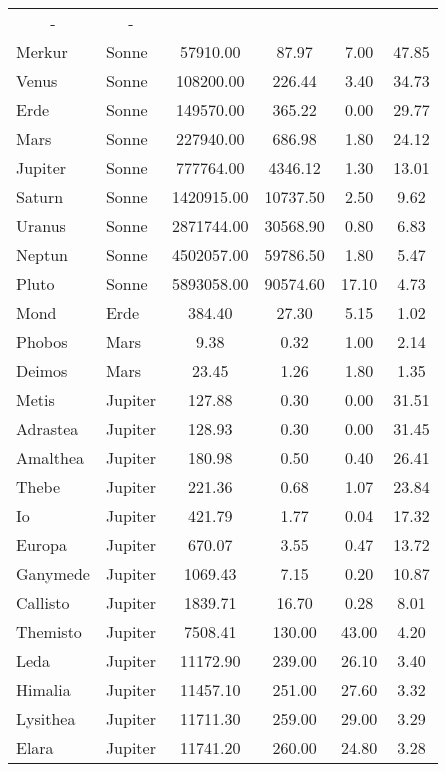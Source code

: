 \documentclass[a4paper,12pt]{scrartcl}
\begin{document}
\begin{longtable}{|l|l|S|S|S|S|}
    &   &   \\
  Merkur &  Sonne &  57910.00  & 87.97  & 7.00  & 47.85  \\
  Venus &  Sonne &  108200.00  & 226.44  & 3.40  & 34.73  \\
  Erde &  Sonne &  149570.00  & 365.22  & 0.00  & 29.77  \\
  Mars &  Sonne &  227940.00  & 686.98  & 1.80  & 24.12  \\
  Jupiter &  Sonne &  777764.00  & 4346.12  & 1.30  & 13.01  \\
  Saturn &  Sonne &  1420915.00  & 10737.50  & 2.50  & 9.62  \\
  Uranus &  Sonne &  2871744.00  & 30568.90  & 0.80  & 6.83  \\
  Neptun &  Sonne &  4502057.00  & 59786.50  & 1.80  & 5.47  \\
  Pluto &  Sonne &  5893058.00  & 90574.60  & 17.10  & 4.73  \\
  Mond &  Erde &  384.40  & 27.30  & 5.15  & 1.02  \\
  Phobos &  Mars &  9.38  & 0.32  & 1.00  & 2.14  \\
  Deimos &  Mars &  23.45  & 1.26  & 1.80  & 1.35  \\
  Metis &  Jupiter &  127.88  & 0.30  & 0.00  & 31.51  \\
  Adrastea &  Jupiter &  128.93  & 0.30  & 0.00  & 31.45  \\
  Amalthea &  Jupiter &  180.98  & 0.50  & 0.40  & 26.41  \\
  Thebe &  Jupiter &  221.36  & 0.68  & 1.07  & 23.84  \\
  Io &  Jupiter &  421.79  & 1.77  & 0.04  & 17.32  \\
  Europa &  Jupiter &  670.07  & 3.55  & 0.47  & 13.72  \\
  Ganymede &  Jupiter &  1069.43  & 7.15  & 0.20  & 10.87  \\
  Callisto &  Jupiter &  1839.71  & 16.70  & 0.28  & 8.01  \\
  Themisto &  Jupiter &  7508.41  & 130.00  & 43.00  & 4.20  \\
  Leda &  Jupiter &  11172.90  & 239.00  & 26.10  & 3.40  \\
  Himalia &  Jupiter &  11457.10  & 251.00  & 27.60  & 3.32  \\
  Lysithea &  Jupiter &  11711.30  & 259.00  & 29.00  & 3.29  \\
  Elara &  Jupiter &  11741.20  & 260.00  & 24.80  & 3.28  \\

\end{longtable}
\end{document}
